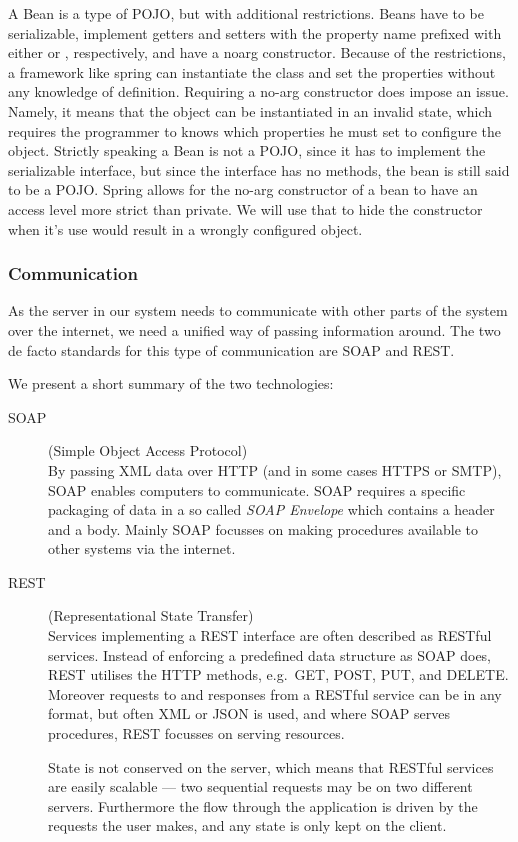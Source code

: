 A Bean is a type of \ac{POJO}, but with additional restrictions.
Beans have to be serializable, implement getters and setters with the property name prefixed with either  or , respectively, and have a noarg constructor.
Because of the restrictions, a framework like spring can instantiate the class and set the properties without any knowledge of definition.
Requiring a no-arg constructor does impose an issue.
Namely, it means that the object can be instantiated in an invalid state, which requires the programmer to knows which properties he must set to configure the object.
Strictly speaking a Bean is not a \ac{POJO}, since it has to implement the serializable interface, but since the interface has no methods, the bean is still said to be a \ac{POJO}.
Spring allows for the no-arg constructor of a bean to have an access level more strict than private.
We will use that to hide the constructor when it's use would result in a wrongly configured object.


\subsubsection{Communication}
\label{subsec:tech_communication}
As the server in our system needs to communicate with other parts of the system over the internet, we need a unified way of passing information around.
The two de facto standards for this type of communication are SOAP and REST.

We present a short summary of the two technologies:
\begin{description}
    \item[SOAP] (Simple Object Access Protocol)\cite{SOAP_spec}\hfill\\
        By passing XML data over HTTP (and in some cases HTTPS or SMTP), SOAP enables computers to communicate.
        SOAP requires a specific packaging of data in a so called \textit{SOAP Envelope} which contains a header and a body.
        Mainly SOAP focusses on making procedures available to other systems via the internet.
    \item[REST] (Representational State Transfer)\cite{RESTful_best_practices}\hfill\\
        Services implementing a REST interface are often described as RESTful services.
        Instead of enforcing a predefined data structure as SOAP does, REST utilises the HTTP methods, e.g.~GET, POST, PUT, and DELETE.
        Moreover requests to and responses from a RESTful service can be in any format, but often XML or JSON is used,
        and where SOAP serves procedures, REST focusses on serving resources.

        State is not conserved on the server, which means that RESTful services are easily scalable --- two sequential requests may be on two different servers.
        Furthermore the flow through the application is driven by the requests the user makes, and any state is only kept on the client.
\end{description}


